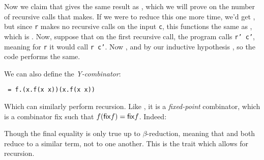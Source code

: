 Now we claim that  gives the same result as , which we will prove on the number of recursive calls that  makes.
If we were to reduce this one more time, we'd get , but since {\tt r} makes no recursive calls on the input {\tt c}, this functions the same as ,
which is .
Now, suppose that on the first recursive call, the program calls {\tt r' c'}, meaning for {\tt r} it would call {\tt r c'}.
Now , and by our inductive hypothesis , so the code performs the same.

We can also define the {\it Y-combinator}:

\medskip
\centerline{\tt\Y\ = \lambda f.(\lambda x.f(x x))(\lambda x.f(x x))}

Which can similarly perform recursion.
Like , it is a {\it fixed-point} combinator, which is a combinator {\sf fix} such that $f({\sf fix}f)={\sf fix}f$.
Indeed:

\medskip
{}

Though the final equality is only true up to $\beta$-reduction, meaning that  and  both reduce to a similar term, not to one another.
This is the trait which allows for recursion.

